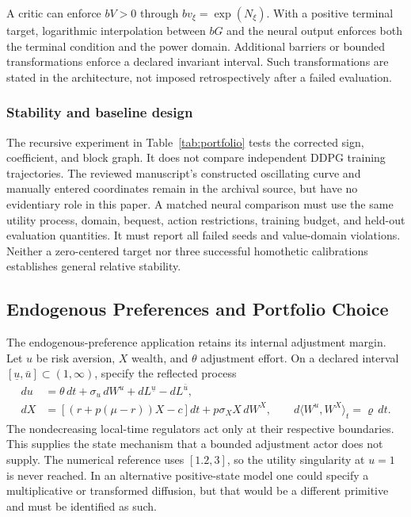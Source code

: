 A critic can enforce $bV>0$ through $b v_\xi=\exp(N_\xi)$. With a positive terminal target, logarithmic interpolation between $bG$ and the neural output enforces both the terminal condition and the power domain. Additional barriers or bounded transformations enforce a declared invariant interval. Such transformations are stated in the architecture, not imposed retrospectively after a failed evaluation.

\subsubsection{Stability and baseline design}
The recursive experiment in Table~\ref{tab:portfolio} tests the corrected sign, coefficient, and block graph. It does not compare independent DDPG training trajectories. The reviewed manuscript's constructed oscillating curve and manually entered coordinates remain in the archival source, but have no evidentiary role in this paper. A matched neural comparison must use the same utility process, domain, bequest, action restrictions, training budget, and held-out evaluation quantities. It must report all failed seeds and value-domain violations. Neither a zero-centered target nor three successful homothetic calibrations establishes general relative stability.

\subsection{Endogenous Preferences and Portfolio Choice}\label{sec:ndu}
The endogenous-preference application retains its internal adjustment margin. Let $u$ be risk aversion, $X$ wealth, and $\theta$ adjustment effort. On a declared interval $[\underline u,\bar u]\subset(1,\infty)$, specify the reflected process
\begin{align}
 du&=\theta\,dt+\sigma_u\,dW^u+dL^{\underline u}-dL^{\bar u},\label{eq:ndustate}\\
 dX&=[(r+p(\mu-r))X-c]dt+p\sigma_X X\,dW^X,
 \qquad d\langle W^u,W^X\rangle_t=\varrho\,dt.
\end{align}
The nondecreasing local-time regulators act only at their respective boundaries. This supplies the state mechanism that a bounded adjustment actor does not supply. The numerical reference uses $[1.2,3]$, so the utility singularity at $u=1$ is never reached. In an alternative positive-state model one could specify a multiplicative or transformed diffusion, but that would be a different primitive and must be identified as such.

